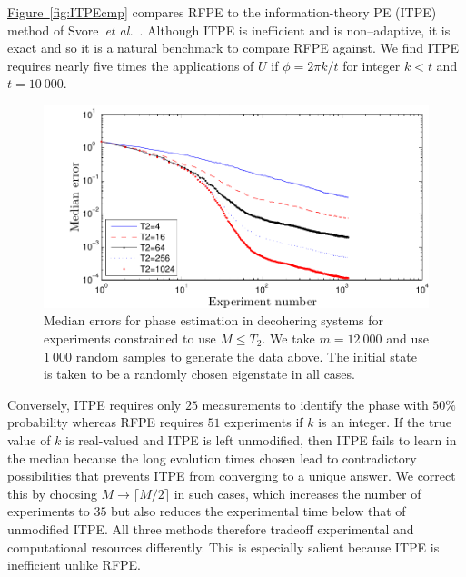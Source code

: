 \documentclass[aps,pra,amsmath,twocolumn,amssymb,superscriptaddress]{revtex4-1}
\newcommand{\fig}[1]{\hyperref[fig:#1]{Figure~\ref*{fig:#1}}}
\newcommand{\etal}{\emph{et al.}}
\begin{document}
\fig{ITPEcmp} compares RFPE to the information-theory PE (ITPE) method of Svore~\etal~\cite{SHF14}.  Although ITPE is inefficient and is non--adaptive, it is exact and so it is a natural benchmark to compare RFPE against.  We find  ITPE requires nearly five times the applications of $U$ if $\phi=2\pi k/t$ for integer $k<t$ and $t=10~000$.

\begin{figure}[t!]
    \begin{centering}
\includegraphics[width=0.95\linewidth]{T2plot_full.pdf}
    \end{centering}
    \caption{\label{fig:T2plot}
Median errors for phase estimation in decohering systems for experiments constrained to use $M\le T_2$.  We take $m=12~000$ and use $1~000$ random samples to generate the data above.  The initial state is taken to be a randomly chosen eigenstate in all cases.
    }
\end{figure}
Conversely,
ITPE requires only $25$ measurements to identify the phase with $50\%$
probability whereas RFPE requires $51$ experiments if $k$ is an integer.  If
the true value of $k$ is real-valued and ITPE is left unmodified, then  ITPE
fails to learn in the median because the long evolution times chosen lead to
contradictory possibilities that prevents ITPE from converging to a unique answer.  We correct
this by choosing $M\rightarrow \lceil M/2\rceil$ in such cases, which increases the number
of experiments to $35$ but also reduces the experimental time below that of
unmodified ITPE.  All three methods therefore
tradeoff experimental and computational resources differently.  This is especially salient because ITPE is inefficient unlike RFPE.
\end{document}

